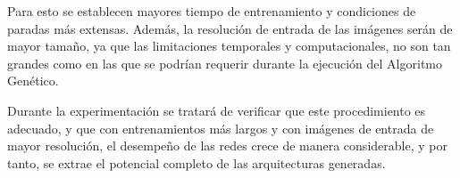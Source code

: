 Para esto se establecen mayores tiempo de entrenamiento y condiciones de paradas más extensas. Además, la resolución de entrada de las imágenes serán de mayor tamaño, ya que las limitaciones temporales y computacionales, no son tan grandes como en las que se podrían requerir durante la ejecución del Algoritmo Genético.

Durante la experimentación se tratará de verificar que este procedimiento es adecuado, y que con entrenamientos más largos y con imágenes de entrada de mayor resolución, el desempeño de las redes crece de manera considerable, y por tanto, se extrae el potencial completo de las arquitecturas generadas.
